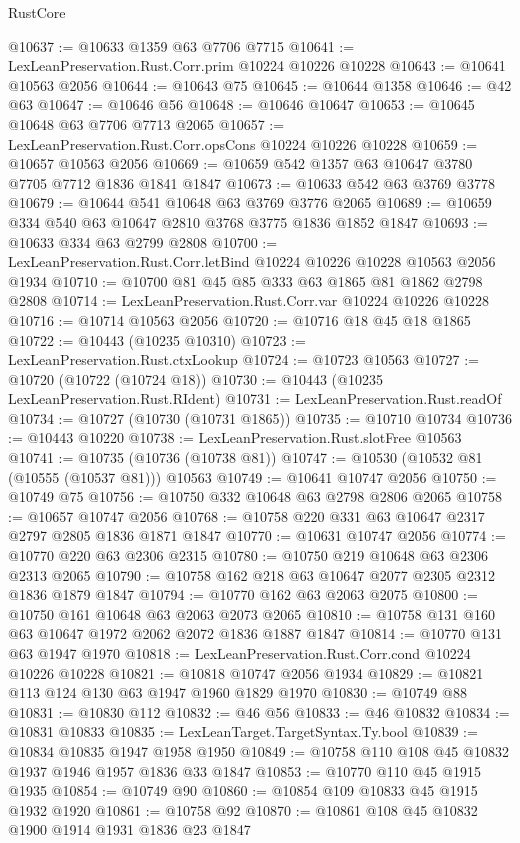 \begin{lexlean}{RustCore}
\begin{coremodule}
@10637 := @10633 @1359 @63 @7706 @7715
@10641 := LexLeanPreservation.Rust.Corr.prim @10224 @10226 @10228
@10643 := @10641 @10563 @2056
@10644 := @10643 @75
@10645 := @10644 @1358
@10646 := @42 @63
@10647 := @10646 @56
@10648 := @10646 @10647
@10653 := @10645 @10648 @63 @7706 @7713 @2065
@10657 := LexLeanPreservation.Rust.Corr.opsCons @10224 @10226 @10228
@10659 := @10657 @10563 @2056
@10669 := @10659 @542 @1357 @63 @10647 @3780 @7705 @7712 @1836 @1841 @1847
@10673 := @10633 @542 @63 @3769 @3778
@10679 := @10644 @541 @10648 @63 @3769 @3776 @2065
@10689 := @10659 @334 @540 @63 @10647 @2810 @3768 @3775 @1836 @1852 @1847
@10693 := @10633 @334 @63 @2799 @2808
@10700 := LexLeanPreservation.Rust.Corr.letBind @10224 @10226 @10228 @10563 @2056 @1934
@10710 := @10700 @81 @45 @85 @333 @63 @1865 @81 @1862 @2798 @2808
@10714 := LexLeanPreservation.Rust.Corr.var @10224 @10226 @10228
@10716 := @10714 @10563 @2056
@10720 := @10716 @18 @45 @18 @1865
@10722 := @10443 (@10235 @10310)
@10723 := LexLeanPreservation.Rust.ctxLookup
@10724 := @10723 @10563
@10727 := @10720 (@10722 (@10724 @18))
@10730 := @10443 (@10235 LexLeanPreservation.Rust.RIdent)
@10731 := LexLeanPreservation.Rust.readOf
@10734 := @10727 (@10730 (@10731 @1865))
@10735 := @10710 @10734
@10736 := @10443 @10220
@10738 := LexLeanPreservation.Rust.slotFree @10563
@10741 := @10735 (@10736 (@10738 @81))
@10747 := @10530 (@10532 @81 (@10555 (@10537 @81))) @10563
@10749 := @10641 @10747 @2056
@10750 := @10749 @75
@10756 := @10750 @332 @10648 @63 @2798 @2806 @2065
@10758 := @10657 @10747 @2056
@10768 := @10758 @220 @331 @63 @10647 @2317 @2797 @2805 @1836 @1871 @1847
@10770 := @10631 @10747 @2056
@10774 := @10770 @220 @63 @2306 @2315
@10780 := @10750 @219 @10648 @63 @2306 @2313 @2065
@10790 := @10758 @162 @218 @63 @10647 @2077 @2305 @2312 @1836 @1879 @1847
@10794 := @10770 @162 @63 @2063 @2075
@10800 := @10750 @161 @10648 @63 @2063 @2073 @2065
@10810 := @10758 @131 @160 @63 @10647 @1972 @2062 @2072 @1836 @1887 @1847
@10814 := @10770 @131 @63 @1947 @1970
@10818 := LexLeanPreservation.Rust.Corr.cond @10224 @10226 @10228
@10821 := @10818 @10747 @2056 @1934
@10829 := @10821 @113 @124 @130 @63 @1947 @1960 @1829 @1970
@10830 := @10749 @88
@10831 := @10830 @112
@10832 := @46 @56
@10833 := @46 @10832
@10834 := @10831 @10833
@10835 := LexLeanTarget.TargetSyntax.Ty.bool
@10839 := @10834 @10835 @1947 @1958 @1950
@10849 := @10758 @110 @108 @45 @10832 @1937 @1946 @1957 @1836 @33 @1847
@10853 := @10770 @110 @45 @1915 @1935
@10854 := @10749 @90
@10860 := @10854 @109 @10833 @45 @1915 @1932 @1920
@10861 := @10758 @92
@10870 := @10861 @108 @45 @10832 @1900 @1914 @1931 @1836 @23 @1847

\end{coremodule}
\end{lexlean}
